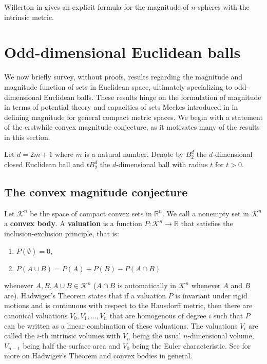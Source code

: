 \documentclass[11pt]{article}
\theoremstyle{mythm}
\begin{document}
Willerton in \cite{willerton_magnitude_2014} gives an explicit formula for the magnitude of $n$-spheres with the intrinsic metric.

\section{Odd-dimensional Euclidean balls}

We now briefly survey, without proofs, results regarding the magnitude and magnitude function of sets in Euclidean space, ultimately specializing to odd-dimensional Euclidean balls. These results hinge on the formulation of magnitude in terms of potential theory and capacities of sets Meckes introduced in \cite{meckes_magnitude_2015} in defining magnitude for general compact metric spaces. We begin with a statement of the erstwhile convex magnitude conjecture, as it motivates many of the results in this section.

Let $d = 2m+1$ where $m$ is a natural number. Denote by $B_2^d$ the $d$-dimensional closed Euclidean ball and $tB_2^d$ the $d$-dimensional ball with radius $t$ for $t > 0$.

\subsection{The convex magnitude conjecture}

Let $\mathcal{K}^n$ be the space of compact convex sets in $\mathbb{R}^n$. We call a nonempty set in $\mathcal{K}^n$ a \textbf{convex body}. A \textbf{valuation} is a function $P:\mathcal{K}^n \to\mathbb{R}$ that satisfies the inclusion-exclusion principle, that is:
\begin{enumerate}[label=$\bullet$]
\item $P(\emptyset) = 0$,
\item $P(A\cup B) = P(A) + P(B) - P(A\cap B)$
\end{enumerate}
whenever $A,B,A\cup B \in \mathcal{K}^n$ ($A\cap B$ is automatically in $\mathcal{K}^n$ whenever $A$ and $B$ are). Hadwiger's Theorem states that if a valuation $P$ is invariant under rigid motions and is continuous with respect to the Hausdorff metric, then there are canonical valuations $V_0,V_1,\dots,V_n$ that are homogenous of degree $i$ such that $P$ can be written as a linear combination of these valuations. The valuations $V_i$ are called the $i$-th intrinsic volumes with $V_n$ being the usual $n$-dimensional volume, $V_{n-1}$ being half the surface area and $V_0$ being the Euler characteristic. See \cite{schneider_convex_2014} for more on Hadwiger's Theorem and convex bodies in general.
\end{document}
